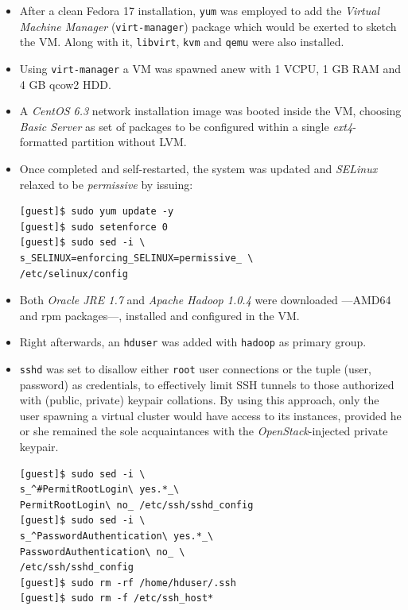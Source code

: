 \documentclass{sig-alternate}
\begin{document}
\begin{itemize}
 \item After a clean Fedora 17 installation, \texttt{yum} was employed to add the \emph{Virtual Machine Manager} (\texttt{virt-manager}) package which would be exerted to sketch the VM. Along with it, \texttt{libvirt}, \texttt{kvm} and \texttt{qemu} were also installed.
 
 \item Using \texttt{virt-manager} a VM was spawned anew with 1 VCPU, 1 GB RAM and 4 GB qcow2 HDD.
 
 \item A \emph{CentOS 6.3} network installation image was booted inside the VM, choosing \emph{Basic Server} as set of packages to be configured within a single \emph{ext4}-formatted partition without LVM.
 
 \item Once completed and self-restarted, the system was updated and \emph{SELinux} relaxed to be \emph{permissive} by issuing:
 
 \begin{verbatim}
[guest]$ sudo yum update -y
[guest]$ sudo setenforce 0
[guest]$ sudo sed -i \
s_SELINUX=enforcing_SELINUX=permissive_ \
/etc/selinux/config
 \end{verbatim}
 
 \item Both \emph{Oracle JRE 1.7} and \emph{Apache Hadoop 1.0.4} were downloaded ---AMD64 and rpm packages---, installed and configured in the VM.
 
 \item Right afterwards, an \texttt{hduser} was added with \texttt{hadoop} as primary group.

 \item \texttt{sshd} was set to disallow either \texttt{root} user connections or the tuple (user, password) as credentials, to effectively limit SSH tunnels to those authorized with (public, private) keypair collations. By using this approach, only the user spawning a virtual cluster would have access to its instances, provided he or she remained the sole acquaintances with the \emph{OpenStack}-injected private keypair.
 
   \begin{verbatim}
[guest]$ sudo sed -i \
s_^#PermitRootLogin\ yes.*_\
PermitRootLogin\ no_ /etc/ssh/sshd_config
[guest]$ sudo sed -i \
s_^PasswordAuthentication\ yes.*_\
PasswordAuthentication\ no_ \
/etc/ssh/sshd_config
[guest]$ sudo rm -rf /home/hduser/.ssh
[guest]$ sudo rm -f /etc/ssh_host*
   \end{verbatim}
   

\end{itemize}
\end{document}
